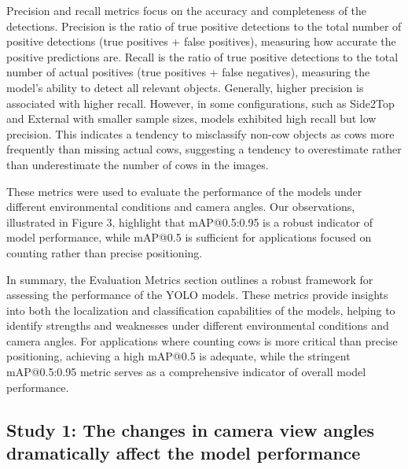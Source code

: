 Precision and recall metrics focus on the accuracy and completeness of the detections. Precision is the ratio of true positive detections to the total number of positive detections (true positives + false positives), measuring how accurate the positive predictions are. Recall is the ratio of true positive detections to the total number of actual positives (true positives + false negatives), measuring the model’s ability to detect all relevant objects. Generally, higher precision is associated with higher recall. However, in some configurations, such as Side2Top and External with smaller sample sizes, models exhibited high recall but low precision. This indicates a tendency to misclassify non-cow objects as cows more frequently than missing actual cows, suggesting a tendency to overestimate rather than underestimate the number of cows in the images.

These metrics were used to evaluate the performance of the models under different environmental conditions and camera angles. Our observations, illustrated in Figure 3, highlight that mAP@0.5:0.95 is a robust indicator of model performance, while mAP@0.5 is sufficient for applications focused on counting rather than precise positioning.

In summary, the Evaluation Metrics section outlines a robust framework for assessing the performance of the YOLO models. These metrics provide insights into both the localization and classification capabilities of the models, helping to identify strengths and weaknesses under different environmental conditions and camera angles. For applications where counting cows is more critical than precise positioning, achieving a high mAP@0.5 is adequate, while the stringent mAP@0.5:0.95 metric serves as a comprehensive indicator of overall model performance.





\subsection*{Study 1: The changes in camera view angles dramatically affect the model performance}




